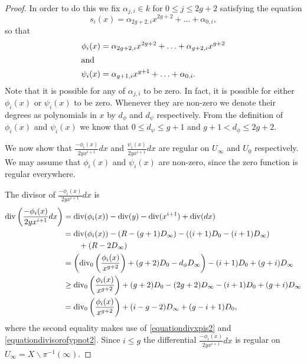 \begin{proof}
    
    In order to do this we fix $\alpha_{j,i} \in k$ for $0\leq j \leq 2g+2$ satisfying the equation
        \[
        s_i(x) = \alpha_{2g+2,i}x^{2g+2} + \ldots + \alpha_{0,i},
        \]
    so that
        \begin{align*}
        \phi_i(x)  & = \alpha_{2g+2,i}x^{2g+2} + \ldots + \alpha_{g+2,i}x^{g+2} \\
        \intertext{and }
        \psi_i(x)  & = \alpha_{g+1,i}x^{g+1} + \ldots + \alpha_{0,i}.
        \end{align*}
    Note that it is possible for any of $\alpha_{j,i}$ to be zero. In fact, it is possible for either $\phi_i(x)$ or $\psi_i(x)$ to be zero.
    Whenever they are non-zero we denote their degrees as polynomials in $x$ by $d_\phi$ and $d_\psi$ respectively. From the definition of $\phi_i(x)$ and $\psi_i(x)$ we know that $0 \leq d_\psi \leq g+1$ and $g+1 < d_\phi \leq 2g+2$.
    
    
    We now show that $\frac{-\phi_i(x)}{2yx^{i+1}}dx$ and $\frac{\psi_i(x)}{2yx^{i+1}}dx$ are regular on $U_\infty$ and $U_0$ respectively.
    We may assume that $\phi_i(x)$ and $\psi_i(x)$ are non-zero, since the zero function is regular everywhere.
    
    
    The divisor of $\frac{-\phi_i(x)}{2yx^{i+1}}dx$ is
        \begin{align*}
        \operatorname{div}\left( \frac{-\phi_i(x)}{2yx^{i+1}}dx \right) & =  \operatorname{div}(\phi_i(x)) -\operatorname{div}(y) - \operatorname{div}(x^{i+1}) + \operatorname{div} (dx) \\
        & =  \operatorname{div}(\phi_i(x)) - ( R - (g+1)D_\infty) - ((i+1)D_0 - (i+1)D_\infty) \\
        & \qquad + (R - 2D_\infty) \\
        & =  \left( \operatorname{div}_0\left( \frac{\phi_i(x)}{x^{g+2}}\right) + (g+2)D_0 - d_\phi D_\infty\right) - (i+1)D_0 + (g+i)D_\infty \\
        & \geq  \operatorname{div}_0\left( \frac{\phi_i(x)}{x^{g+2}}\right) + (g+2)D_0 - (2g+2)D_\infty - (i+1)D_0 + (g+i)D_\infty \\
        & =  \operatorname{div}_0\left( \frac{\phi_i(x)}{x^{g+2}} \right) + (i-g-2)D_\infty + (g-i+1)D_0,
        \end{align*}
    where the second equality makes use of \eqref{equationdivxpis2} and \eqref{equationdivisorofypnot2}.
    Since $i \leq g$ the differential $\frac{-\phi_i(x)}{2yx^{i+1}}dx$ is regular on $U_\infty = X\backslash \pi^{-1}(\infty)$.
    

\end{proof}
